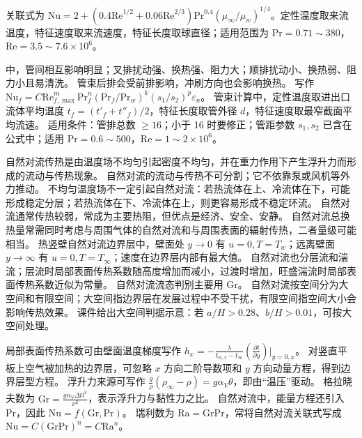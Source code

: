 关联式为 $\mathrm{Nu}=2+(0.4\mathrm{Re}^{1/2}+0.06\mathrm{Re}^{2/3})\mathrm{Pr}^{0.4}(\mu_\infty/\mu_w)^{1/4}$。定性温度取来流温度，特征速度取来流速度，特征长度取球直径；适用范围为 $\mathrm{Pr}=0.71\sim380$，$\mathrm{Re}=3.5\sim7.6\times10^6$。

中，管间相互影响明显；叉排扰动强、换热强、阻力大；顺排扰动小、换热弱、阻力小且易清洗。
管束后排会受前排影响，冲刷方向也会影响换热。
写作 $\mathrm{Nu}_f=C\mathrm{Re}_{f,\max}^m\mathrm{Pr}_f^n(\mathrm{Pr}_f/\mathrm{Pr}_w)^k(s_1/s_2)^p\varepsilon_n$。
管束计算中，定性温度取进出口流体平均温度 $t_f=(t'_f+t''_f)/2$，特征长度取管外径 $d$，特征速度取最窄截面平均流速。
适用条件：管排总数 $\ge16$；小于 16 时要修正；管距参数 $s_1,s_2$ 已含在公式中；适用 $\mathrm{Pr}=0.6\sim500$，$\mathrm{Re}=1\sim2\times10^6$。

\divider


自然对流传热是由温度场不均匀引起密度不均匀，并在重力作用下产生浮升力而形成的流动与传热现象。
自然对流的流动与传热不可分割；它不依靠泵或风机等外力推动。
不均匀温度场不一定引起自然对流：若热流体在上、冷流体在下，可能形成稳定分层；若热流体在下、冷流体在上，则更容易形成不稳定环流。
自然对流通常传热较弱，常成为主要热阻，但优点是经济、安全、安静。
自然对流总换热量常需同时考虑与周围气体的自然对流和与周围表面的辐射传热，二者量级可能相当。
热竖壁自然对流边界层中，壁面处 $y\to0$ 有 $u=0,T=T_w$；远离壁面 $y\to\infty$ 有 $u=0,T=T_\infty$；速度在边界层内部有最大值。
自然对流也分层流和湍流；层流时局部表面传热系数随高度增加而减小，过渡时增加，旺盛湍流时局部表面传热系数近似为常量。
自然对流流态判别主要用 $\mathrm{Gr}$。
自然对流按空间分为大空间和有限空间；大空间指边界层在发展过程中不受干扰，有限空间指空间大小会影响传热效果。
课件给出大空间判据示意：若 $a/H>0.28$、$b/H>0.01$，可按大空间处理。


局部表面传热系数可由壁面温度梯度写作 $h_x=-\frac{\lambda}{t_{w,x}-t_\infty}(\frac{\partial t}{\partial y})\vert_{y=0,x}$。
对竖直平板上空气被加热的边界层，可忽略 $x$ 方向二阶导数项和 $y$ 方向动量方程，得到边界层型方程。
浮升力来源可写作 $\frac{g}{\rho}(\rho_\infty-\rho)=g\alpha_V\theta$，即由“温压”驱动。
格拉晓夫数为 $\mathrm{Gr}=\frac{g\alpha_V\Delta t l^3}{\nu^2}$，表示浮升力与黏性力之比。
自然对流中，能量方程还引入 $\mathrm{Pr}$，因此 $\mathrm{Nu}=f(\mathrm{Gr},\mathrm{Pr})$。
瑞利数为 $\mathrm{Ra}=\mathrm{Gr}\mathrm{Pr}$，常将自然对流关联式写成 $\mathrm{Nu}=C(\mathrm{Gr}\mathrm{Pr})^n=C\mathrm{Ra}^n$。

